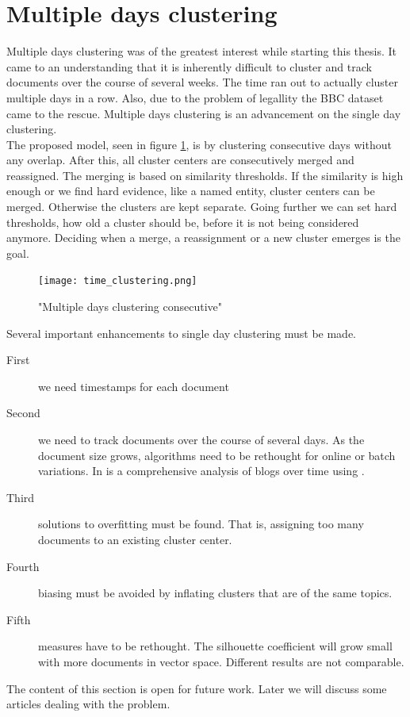 \section{Multiple days clustering}
  Multiple days clustering was of the greatest interest while starting this thesis. It came to an understanding that it is inherently difficult to cluster and track documents over the course of several weeks. The time ran out to actually cluster multiple days in a row. Also, due to the problem of legallity the BBC dataset came to the rescue. Multiple days clustering is an advancement on the single day clustering.\\ 

  The proposed model, seen in figure \ref{time_clustering}, is by clustering consecutive days without any overlap. After this, all cluster centers are consecutively merged and reassigned. The merging is based on similarity thresholds. If the similarity is high enough or we find hard evidence, like a named entity, cluster centers can be merged. Otherwise the clusters are kept separate. Going further we can set hard thresholds, how old a cluster should be, before it is not being considered anymore. Deciding when a merge, a reassignment or a new cluster emerges is the goal.

    \begin{figure}[h!]
      \centering
        \texttt{[image: time\_clustering.png]}
        \caption{"Multiple days clustering consecutive"}
        \label{time_clustering}
    \end{figure} 

  Several important enhancements to single day clustering must be made.

  \begin{description}
    \item[First] we need timestamps for each document
    \item[Second] we need to track documents over the course of several days. As the document size grows, algorithms need to be rethought for online or batch variations. In \cite{BlogTopicLDA2013} is a comprehensive analysis of blogs over time using \lda{}.
    \item[Third] solutions to overfitting must be found. That is, assigning too many documents to an existing cluster center.
    \item[Fourth] biasing must be avoided by inflating clusters that are of the same topics.
    \item[Fifth] measures have to be rethought. The silhouette coefficient will grow small with more documents in vector space. Different results are not comparable.
  \end{description}

  The content of this section is open for future work. Later we will discuss some articles dealing with the problem.



